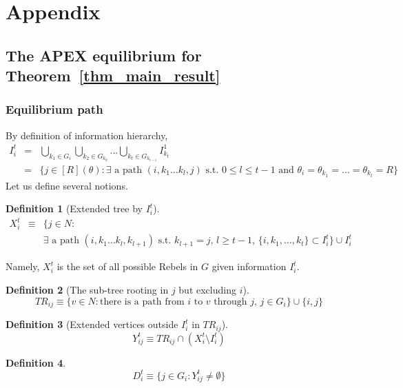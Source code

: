 \documentclass[12pt,letter]{article}
\newtheorem{definition}{Definition}[section]
\theoremstyle{definition}
\theoremstyle{remark}
\theoremstyle{claim}
\begin{document}


\appendix
\section{Appendix}
\subsection{The APEX equilibrium for Theorem~\ref{thm_main_result}}
\subsubsection{Equilibrium path}
\label{sec:equilibrium_path}
By definition of information hierarchy, 
\begin{eqnarray*}
I^t_i & = & \bigcup_{k_1\in G_i}\bigcup_{k_2\in G_{k_0}}...\bigcup_{k_{t}\in G_{k_{t-1}}}I^1_{k_{t}}\\
&= & \{j\in [R](\theta): \text{$\exists$ a path $(i,k_1...k_{l},j)$ s.t.~$0\leq l\leq t-1$ and $\theta_i=\theta_{k_1}=...=\theta_{k_l}=R$}\}
\end{eqnarray*}
Let us define several notions.
\begin{definition}[Extended tree by $I^t_i$]
\label{def:ext_tree}
\begin{eqnarray*}
X^t_i & \equiv &  \{j\in N: \\
	& & \text{$\exists$ a path $(i,k_1...k_{l},k_{l+1})$ s.t.~$k_{l+1}=j$, $l\geq t-1$, $\{i,k_1,...,k_{t}\}\subset I^t_i$}\}\cup I^t_i
\end{eqnarray*}
\end{definition}
Namely, $X^t_i $ is the set of all possible Rebels in $G$ given information $I^t_i$. 

\begin{definition}[The sub-tree rooting in $j$ but excluding $i$]
\[TR_{ij}\equiv \{v\in N:\text{there is a path from $i$ to $v$ through $j$, $j\in G_i$}\}\cup\{i,j\}\]
\end{definition}


\begin{definition}[Extended vertices outside $I^t_i$ in $TR_{ij}$]
\[Y^t_{ij}\equiv TR_{ij}\cap(X^t_i\setminus I^t_i)\]
\end{definition}


\begin{definition}
\[D^t_{i}\equiv \{j\in G_i: Y^t_{ij}\neq \emptyset\}\]
\end{definition}
\end{document}
